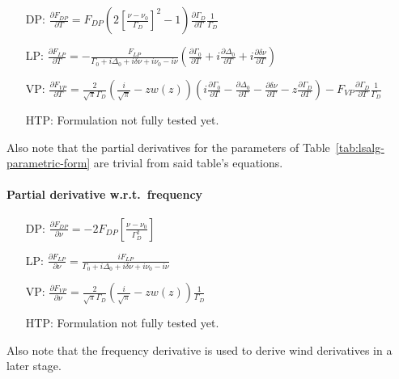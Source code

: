 \begin{itemize}
 \item[DP:] $\frac{\partial F_{DP}}{\partial T} = F_{DP}\left(2\left[\frac{\nu - \nu_0}{\Gamma_D}\right]^2-1\right) \frac{\partial \Gamma_D}{\partial T} \frac{1}{\Gamma_D}$
 
 \item[LP:] $\frac{\partial F_{LP}}{\partial T} = -\frac{F_{LP}}{\Gamma_0+i\Delta_0+i\delta\nu+i\nu_0-i\nu} \left( \frac{\partial \Gamma_0}{\partial T} + i\frac{\partial \Delta_0}{\partial T} + i \frac{\partial \delta\nu}{\partial T}\right)$ 
 
 \item[VP:] $\frac{\partial F_{VP}}{\partial T} = \frac{2}{\sqrt{\pi}\Gamma_D}\left(\frac{i}{\sqrt{\pi}} - z w\left(z\right) \right)
 \left(i\frac{\partial \Gamma_0}{\partial T} - \frac{\partial\Delta_0}{\partial T} - \frac{\partial\delta\nu}{\partial T} -z\frac{\partial\Gamma_D}{\partial T}\right) - F_{VP}\frac{\partial\Gamma_D}{\partial T}\frac{1}{\Gamma_D}$
 
 \item[HTP:] Formulation not fully tested yet.
\end{itemize}
Also note that the partial derivatives for the parameters of 
Table~\ref{tab:lsalg-parametric-form} are trivial from said table's equations.

\paragraph*{Partial derivative w.r.t.\ frequency}

\begin{itemize}
 \item[DP:] $\frac{\partial F_{DP}}{\partial \nu} = -2 F_{DP} \left[\frac{\nu - \nu_0}{\Gamma_D^2}\right]$
 
 \item[LP:] $\frac{\partial F_{LP}}{\partial\nu} = \frac{iF_{LP}}{\Gamma_0+i\Delta_0+i\delta\nu+i\nu_0-i\nu}$
 
 \item[VP:] $\frac{\partial F_{VP}}{\partial \nu} = \frac{2}{\sqrt{\pi}\Gamma_D}\left(\frac{i}{\sqrt{\pi}} - z w\left(z\right) \right) \frac{1}{\Gamma_D}$
 
 \item[HTP:] Formulation not fully tested yet.
\end{itemize}
Also note that the frequency derivative is used to derive wind derivatives
in a later stage.

